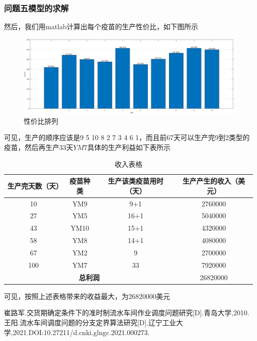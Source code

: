 \documentclass{ctexart}
\begin{document}
\subsubsection{问题五模型的求解}
然后，我们用matlab计算出每个疫苗的生产性价比，如下图所示\par
\begin{figure}[h]
\centering
\includegraphics[width=\linewidth]{A4图片/A5pre.jpg}
\caption{性价比排列}
\end{figure}
可见，生产的顺序应该是9 5 10 8 2 7 3 4 6 1，而且前67天可以生产完9到2类型的疫苗，然后再生产33天$YM7$具体的生产利益如下表所示

\begin{table}[!ht]
    \centering
    \begin{tabular}{|c|c|c|c|}
    \hline
        \textbf{生产完天数（天）} & \textbf{疫苗种类} & \textbf{生产该类疫苗用时（天）} & \textbf{生产产生的收入（美元）} \\ \hline
        10 & YM9 & 9+1 & 2760000 \\ \hline
        27 & YM5 & 16+1 & 5040000 \\ \hline
        43 & YM10 & 15+1 & 4320000 \\ \hline
        58 & YM8 & 14+1 & 4080000 \\ \hline
        67 & YM2 & 9 & 2700000 \\ \hline
        100 & YM7 & 33 & 7920000 \\ \hline
        \multicolumn{3}{|c|}{\textbf{总利润}} & 26820000 \\ \hline
    \end{tabular}
    \caption{收入表格}
\end{table}
可见，按照上述表格带来的收益最大，为26820000美元

\newpage
\clearpage
{}
{}
\begin{thebibliography}{99}  
崔路军.交货期确定条件下的准时制流水车间作业调度问题研究[D].青岛大学,2010.
王阳.流水车间调度问题的分支定界算法研究[D].辽宁工业大学,2021.DOI:10.27211/d.cnki.glngc.2021.000273.
\end{thebibliography}
\end{document}
